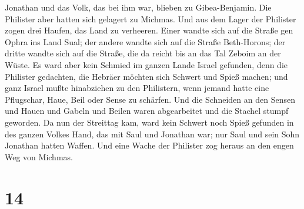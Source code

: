 Jonathan und das Volk, das bei ihm war, blieben zu Gibea-Benjamin. Die
Philister aber hatten sich gelagert zu Michmas.  Und aus
dem Lager der Philister zogen drei Haufen, das Land zu verheeren. Einer
wandte sich auf die Straße gen Ophra ins Land Sual;  der
andere wandte sich auf die Straße Beth-Horons; der dritte wandte sich
auf die Straße, die da reicht bis an das Tal Zeboim an der Wüste.
 Es ward aber kein Schmied im ganzen Lande Israel gefunden,
denn die Philister gedachten, die Hebräer möchten sich Schwert und Spieß
machen;  und ganz Israel mußte hinabziehen zu den
Philistern, wenn jemand hatte eine Pflugschar, Haue, Beil oder Sense zu
schärfen.  Und die Schneiden an den Sensen und Hauen und
Gabeln und Beilen waren abgearbeitet und die Stachel stumpf geworden.
 Da nun der Streittag kam, ward kein Schwert noch Spieß
gefunden in des ganzen Volkes Hand, das mit Saul und Jonathan war; nur
Saul und sein Sohn Jonathan hatten Waffen.  Und eine Wache
der Philister zog heraus an den engen Weg von Michmas.

\hypertarget{section-13}{%
\section{14}\label{section-13}}

